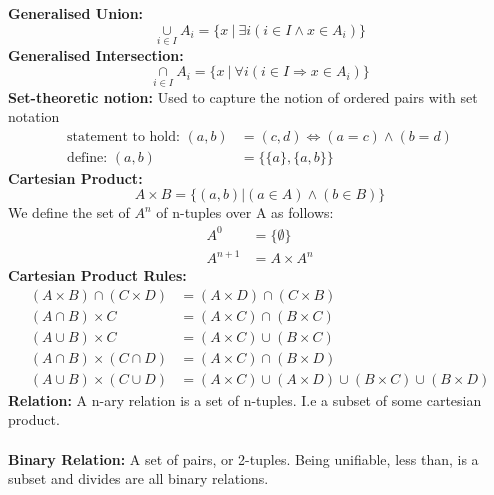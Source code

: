 \documentclass[a4paper,10pt]{article}
\begin{document}
\textcolor{BlueGreen}{\textbf{Generalised Union:}} \\
\begin{equation*}
\underset{i \in I}{\cup} A_{i} = \{ x \ | \  \exists i (i \in I \land x \in A_{i})\}
\end{equation*}
\textcolor{BlueGreen}{\textbf{Generalised Intersection:}} \\
\begin{equation*}
\underset{i \in I}{\cap} A_{i} = \{ x \ | \  \forall i (i \in I \Rightarrow x \in A_{i})\}
\end{equation*}
\newline
\textcolor{BlueGreen}{\textbf{Set-theoretic notion:}} Used to capture the notion of ordered pairs with set notation \\
\begin{align*}
\textrm{statement to hold: }(a,b) &= (c,d) \Leftrightarrow (a = c) \land (b = d) \\
\textrm{define: } (a,b) &= \{\{a\},\{a,b\}\}
\end{align*}
\textcolor{BlueGreen}{\textbf{Cartesian Product:}} \\
\begin{equation*}
A \times B = \{(a,b) | (a \in A) \land (b \in B)\}
\end{equation*}
\newline
We define the set of $A^{n}$ of n-tuples over A as follows: 
\begin{align*}
A^{0} &= \{\emptyset \} \\
A^{n+1} &= A \times A^{n}
\end{align*}
\textcolor{BlueGreen}{\textbf{Cartesian Product Rules:}} \\
\begin{align*}
(A \times B) \cap (C \times D) &= (A \times D) \cap (C \times B) \\
(A \cap B) \times C &= (A \times C) \cap (B \times C) \\
(A \cup B) \times C &= (A \times C ) \cup (B \times C) \\ 
(A \cap B) \times (C \cap D) &= (A \times C) \cap (B \times D) \\ 
(A \cup B) \times (C \cup D) &= (A \times C) \cup (A \times D) \cup (B \times C) \cup (B \times D)
\end{align*}
\textcolor{BlueGreen}{\textbf{Relation:}} A n-ary relation is a set of n-tuples. I.e a subset of some cartesian product. \\\\
\textcolor{BlueGreen}{\textbf{Binary Relation:}} A set of pairs, or 2-tuples. Being unifiable, less than, is a subset and divides are all binary relations. \\\\
\end{document}
